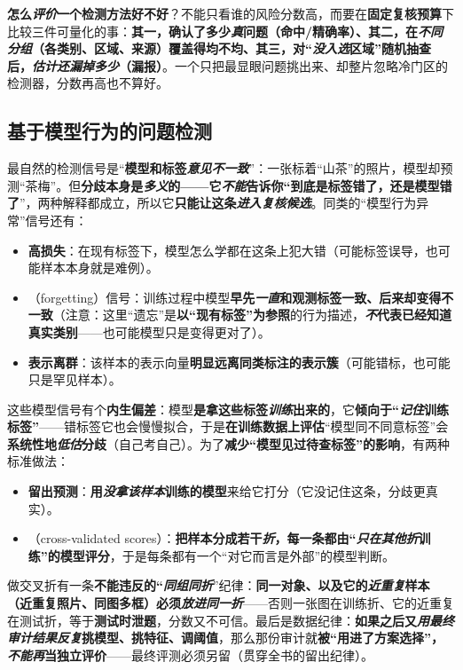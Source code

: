 \textbf{怎么\emph{评价}一个检测方法好不好}？不能只看谁的风险分数高，而要在\textbf{固定复核预算}下比较三件可量化的事：\textbf{其一，确认了多少\emph{真}问题（命中/精确率）、其二，在\emph{不同分组}（各类别、区域、来源）覆盖得均不均、其三，对“\emph{没入选}区域”随机抽查后，\emph{估计还漏掉多少}（漏报）}。一个只把最显眼问题挑出来、却整片忽略冷门区的检测器，分数再高也不算好。

\subsection{基于模型行为的问题检测}
\label{sec:knowledge-quality-assessment-correction-model-detection}

最自然的检测信号是“\textbf{模型和标签\emph{意见不一致}}”：一张标着“山茶”的照片，模型却预测“茶梅”。但\textbf{分歧本身是\emph{多义}的——它\emph{不能}告诉你“到底是标签错了，还是模型错了}”，两种解释都成立，所以它\textbf{只能让这条\emph{进入复核候选}}。同类的“模型行为异常”信号还有：
\begin{itemize}\item \textbf{高损失}：在现有标签下，模型怎么学都在这条上犯大错（可能标签误导，也可能样本本身就是难例）。\item {}（forgetting）信号：训练过程中模型\textbf{早先\emph{一直}和观测标签一致、后来却变得不一致}（注意：这里“遗忘”是\textbf{以“现有标签”为参照}的行为描述，\textbf{\emph{不}代表已经知道真实类别}——也可能模型只是变得更对了）。\item \textbf{表示离群}：该样本的表示向量\textbf{明显远离同类标注的表示簇}（可能错标，也可能只是罕见样本）。\end{itemize}这些模型信号有个\textbf{内生偏差}：模型\textbf{是拿这些标签\emph{训练}出来的}，它\textbf{倾向于“\emph{记住}训练标签”}——错标签它也会慢慢拟合，于是\textbf{在训练数据上评估}“模型同不同意标签”会\textbf{系统性地\emph{低估}分歧}（自己考自己）。为了\textbf{减少“模型见过待查标签”的影响}，有两种标准做法：
\begin{itemize}\item \textbf{留出预测}：\textbf{用\emph{没拿该样本}训练的模型}来给它打分（它没记住这条，分歧更真实）。\item {}（cross-validated scores）：\textbf{把样本分成若干\emph{折}，每一条都由“\emph{只在其他折}训练”的模型评分}，于是每条都有一个“对它而言是外部”的模型判断。\end{itemize}
做交叉折有一条\textbf{不能违反的“\emph{同组同折}}”纪律：\textbf{同一对象、以及它的\emph{近重复}样本（近重复照片、同图多框）必须\emph{放进同一折}}——否则一张图在训练折、它的近重复在测试折，等于\textbf{测试时泄题}，分数又不可信。最后是数据纪律：\textbf{如果之后又\emph{用最终审计结果反复}挑模型、挑特征、调阈值}，那么那份审计就\textbf{被“用进了方案选择”，\emph{不能再}当独立评价}——最终评测必须另留（贯穿全书的留出纪律）。

